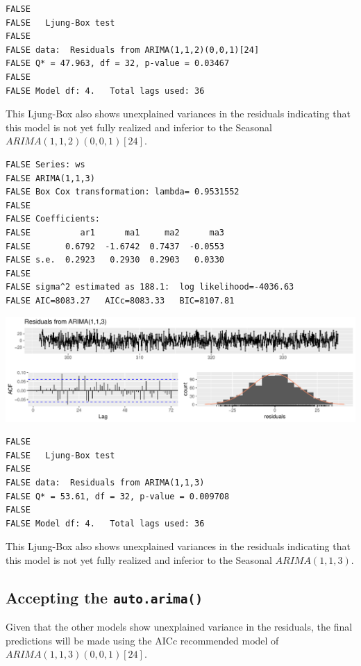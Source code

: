 \documentclass[openany]{book}
\begin{document}
\begin{verbatim}
FALSE 
FALSE   Ljung-Box test
FALSE 
FALSE data:  Residuals from ARIMA(1,1,2)(0,0,1)[24]
FALSE Q* = 47.963, df = 32, p-value = 0.03467
FALSE 
FALSE Model df: 4.   Total lags used: 36
\end{verbatim}

This Ljung-Box also shows unexplained variances in the residuals
indicating that this model is not yet fully realized and inferior to the
Seasonal \(ARIMA (1,1,2)(0,0,1)[24]\).

\begin{verbatim}
FALSE Series: ws 
FALSE ARIMA(1,1,3) 
FALSE Box Cox transformation: lambda= 0.9531552 
FALSE 
FALSE Coefficients:
FALSE          ar1      ma1     ma2      ma3
FALSE       0.6792  -1.6742  0.7437  -0.0553
FALSE s.e.  0.2923   0.2930  0.2903   0.0330
FALSE 
FALSE sigma^2 estimated as 188.1:  log likelihood=-4036.63
FALSE AIC=8083.27   AICc=8083.33   BIC=8107.81
\end{verbatim}

\includegraphics{Group2_Project1_Fall2019_files/figure-latex/unnamed-chunk-28-1.pdf}

\begin{verbatim}
FALSE 
FALSE   Ljung-Box test
FALSE 
FALSE data:  Residuals from ARIMA(1,1,3)
FALSE Q* = 53.61, df = 32, p-value = 0.009708
FALSE 
FALSE Model df: 4.   Total lags used: 36
\end{verbatim}

This Ljung-Box also shows unexplained variances in the residuals
indicating that this model is not yet fully realized and inferior to the
Seasonal \(ARIMA (1,1,3)\).

\hypertarget{accepting-the-auto.arima}{%
\subsection{\texorpdfstring{Accepting the
\texttt{auto.arima()}}{Accepting the auto.arima()}}\label{accepting-the-auto.arima}}

Given that the other models show unexplained variance in the residuals,
the final predictions will be made using the AICc recommended model of
\(ARIMA (1,1,3)(0,0,1)[24]\).
\end{document}
